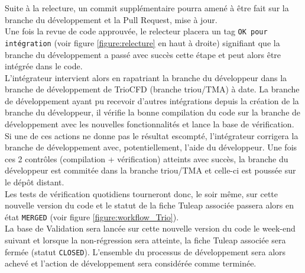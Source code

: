 Suite à la relecture, un commit supplémentaire pourra amené à être
fait sur la branche du développement et la Pull Request, mise à jour.\\

Une fois la revue de code approuvée, le relecteur placera un tag \texttt{OK pour intégration}
(voir figure \ref{figure:relecture} en haut à droite) signifiant que la branche 
du développement a passé avec succès cette étape et peut alors être intégrée dans le code.\\

L'intégrateur intervient alors en rapatriant la branche du développeur dans la branche
de développement de TrioCFD (branche triou/TMA) à date.
La branche de développement ayant pu recevoir d'autres intégrations depuis la création de la branche du développeur,
il vérifie la bonne compilation du code sur la branche de développement avec les nouvelles fonctionnalités
et lance la base de vérification.\\

Si une de ces actions ne donne pas le résultat escompté, l'intégrateur corrigera
la branche de développement avec, potentiellement, l'aide du développeur.
Une fois ces 2 contrôles (compilation + vérification) atteints avec succès,
la branche du développeur est commitée dans la branche triou/TMA et celle-ci est poussée sur le dépôt distant.\\

Les tests de vérification quotidiens tourneront donc, le soir même,
sur cette nouvelle version du code et le statut de la fiche Tuleap associée passera
alors en état \texttt{MERGED} (voir figure \ref{figure:workflow_Trio}).\\

La base de Validation sera lancée sur cette nouvelle version du code le week-end suivant
et lorsque la non-régression sera atteinte, la fiche Tuleap associée sera fermée (statut \texttt{CLOSED}).
L'ensemble du processus de développement sera alors achevé et l'action de développement sera considérée comme terminée.

